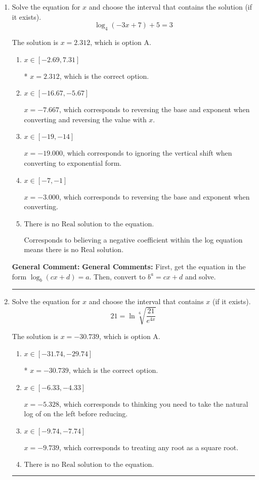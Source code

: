 \documentclass{extbook}[14pt]
\newcommand{\litem}[1]{\item #1

\rule{\textwidth}{0.4pt}}
\begin{document}
\begin{enumerate}\litem{
Solve the equation for $x$ and choose the interval that contains the solution (if it exists).
\[ \log_{4}{(-3x+7)}+5 = 3 \]

The solution is \( x = 2.312 \), which is option A.\begin{enumerate}[label=\Alph*.]
\item \( x \in [-2.69, 7.31] \)

* $x = 2.312$, which is the correct option.
\item \( x \in [-16.67, -5.67] \)

$x = -7.667$, which corresponds to reversing the base and exponent when converting and reversing the value with $x$.
\item \( x \in [-19, -14] \)

$x = -19.000$, which corresponds to ignoring the vertical shift when converting to exponential form.
\item \( x \in [-7, -1] \)

$x = -3.000$, which corresponds to reversing the base and exponent when converting.
\item \( \text{There is no Real solution to the equation.} \)

Corresponds to believing a negative coefficient within the log equation means there is no Real solution.
\end{enumerate}

\textbf{General Comment:} \textbf{General Comments:} First, get the equation in the form $\log_b{(cx+d)} = a$. Then, convert to $b^a = cx+d$ and solve.
}
\litem{
 Solve the equation for $x$ and choose the interval that contains $x$ (if it exists).
\[  21 = \ln{\sqrt[6]{\frac{21}{e^{4x}}}} \]

The solution is \( x = -30.739 \), which is option A.\begin{enumerate}[label=\Alph*.]
\item \( x \in [-31.74, -29.74] \)

* $x = -30.739$, which is the correct option.
\item \( x \in [-6.33, -4.33] \)

$x = -5.328$, which corresponds to thinking you need to take the natural log of on the left before reducing.
\item \( x \in [-9.74, -7.74] \)

$x = -9.739$, which corresponds to treating any root as a square root.
\item \( \text{There is no Real solution to the equation.} \)


\end{enumerate}}
\end{enumerate}
\end{document}
